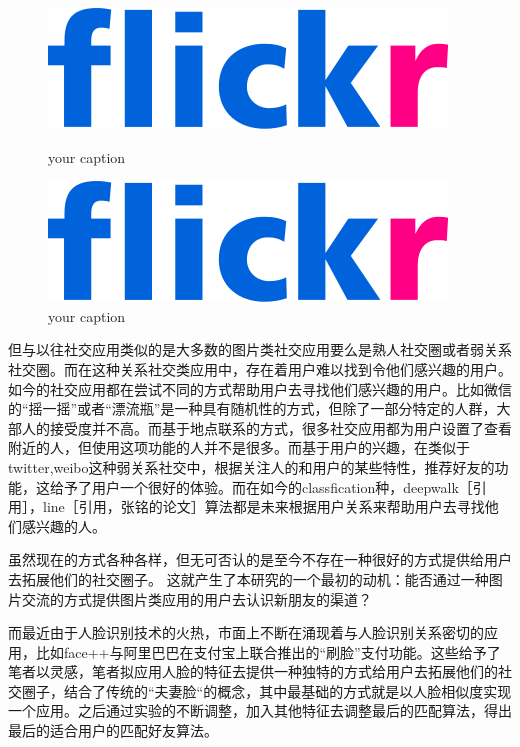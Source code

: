 \begin{figure}[h] 
\begin{minipage}[t]{0.45\linewidth}
\centering
\includegraphics[width=\textwidth]{img/chap1/flickr.png}
\caption{your caption \label{your label}}
\end{minipage}
\hfill
\begin{minipage}[t]{0.45\linewidth}
\centering
\includegraphics[width=\textwidth]{img/chap1/flickr.png}
\caption{your caption\label{your label}}
\end{minipage}
\end{figure}
但与以往社交应用类似的是大多数的图片类社交应用要么是熟人社交圈或者弱关系社交圈。而在这种关系社交类应用中，存在着用户难以找到令他们感兴趣的用户。如今的社交应用都在尝试不同的方式帮助用户去寻找他们感兴趣的用户。比如微信的“摇一摇”或者“漂流瓶”是一种具有随机性的方式，但除了一部分特定的人群，大部人的接受度并不高。而基于地点联系的方式，很多社交应用都为用户设置了查看附近的人，但使用这项功能的人并不是很多。而基于用户的兴趣，在类似于twitter,weibo这种弱关系社交中，根据关注人的和用户的某些特性，推荐好友的功能，这给予了用户一个很好的体验。而在如今的classfication种，deepwalk［引用］，line［引用，张铭的论文］算法都是未来根据用户关系来帮助用户去寻找他们感兴趣的人。

虽然现在的方式各种各样，但无可否认的是至今不存在一种很好的方式提供给用户去拓展他们的社交圈子。
这就产生了本研究的一个最初的动机：能否通过一种图片交流的方式提供图片类应用的用户去认识新朋友的渠道？

而最近由于人脸识别技术的火热，市面上不断在涌现着与人脸识别关系密切的应用，比如face++与阿里巴巴在支付宝上联合推出的“刷脸”支付功能。这些给予了笔者以灵感，笔者拟应用人脸的特征去提供一种独特的方式给用户去拓展他们的社交圈子，结合了传统的“夫妻脸“的概念，其中最基础的方式就是以人脸相似度实现一个应用。之后通过实验的不断调整，加入其他特征去调整最后的匹配算法，得出最后的适合用户的匹配好友算法。
